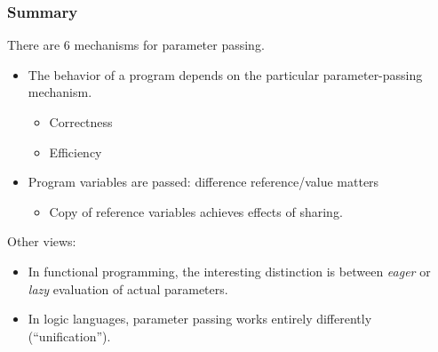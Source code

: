 \documentclass{beamer}
\begin{document}



\begin{frame}
\frametitle{Summary}
There are  6 mechanisms for parameter passing. 
\begin{itemize}
\item The behavior of a program depends on the particular parameter-passing
mechanism.
\begin{itemize}
\item Correctness
\item Efficiency
\end{itemize}
\item Program variables are passed: difference reference/value matters
\begin{itemize}
\item Copy of reference variables achieves effects of sharing.
\end{itemize}

\end{itemize}

\pause\medskip

Other views:
\begin{itemize}
\item In functional programming, the interesting distinction is between
\textit{eager} or \textit{lazy} evaluation of actual parameters. 
\item In logic languages, parameter passing works entirely
differently (``unification'').
\end{itemize}

\end{frame}
\end{document}
